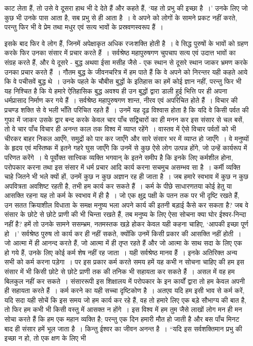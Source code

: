 काट लेता हैं, तो उसे वे दूसरा हाथ भी दे देते हैं और कहते हैं, ‘यह तो प्रभु की इच्छा है~।’ उनके लिए जो कुछ भी उनके पास आता है, सब प्रभु से ही आता है~। वे अपने को लोगों के सामने प्रकट नहीं करते, परन्तु फिर भी वे प्रेम तथा मधुर एवं सत्य भावों के प्रस्रवणस्वरूप हैं~।

इसके बाद फिर वे लोग हैं, जिनमें अपेक्षाकृत अधिक रजःशक्ति होती है~। वे सिद्ध पुरुषों के भावों को ग्रहण करके फिर उनका संसार में प्रचार करते हैं~। सर्वश्रेष्ठ महापुरुषगण चुपचाप सत्य एवं उदात्त भावों का संग्रह करते हैं, और ये दूसरे - बुद्ध अथवा ईसा मसीह जैसे - एक स्थान से दूसरे स्थान जाकर भ्रमण करके उनका प्रचार करते हैं~। गौतम बुद्ध के जीवनचरित्र में हम पाते हैं कि वे अपने को निरन्तर यही कहते आये कि वे पचीसवें बुद्ध थे~। उनके पहले के चौबीस बुद्धों के इतिहास का हमें कोई ज्ञान नहीं, परन्तु फिर भी यह निश्चित है कि ये हमारे ऐतिहासिक बुद्ध अवश्य ही उन बुद्धों द्वारा डाली हुई भित्ति पर ही अपना धर्मप्रासाद निर्माण कर गये हैं~। सर्वश्रेष्ठ महापुरुषगण शान्त, नीरव एवं अपरिचित होते हैं~। विचार की प्रचण्ड शक्ति से वे भली भाँति परिचित रहते हैं~। उनमें यह दृढ़ विश्वास होता है कि यदि वे किसी पर्वत की गुफा में जाकर उसके द्वार बन्द करके केवल चार पाँच सद्विचारों का ही मनन कर इस संसार से चल बसें, तो वे चार पाँच विचार ही अनन्त काल तक विश्व में व्याप्त रहेंगे~। वास्तव में ऐसे विचार पर्वतों को भी चीरकर बाहर निकल आएँगे, समुद्रों को पार कर जाएँगे और सारे संसार भर में व्याप्त हो जाएँगे~। वे मनुष्यों के हृदय एवं मस्तिष्क में इतने गहरे घुस जाएँगे कि उनमें से कुछ ऐसे लोग उत्पन्न होंगे, जो उन्हें कार्यरूप में परिणत करेंगे~। ये पूर्वोक्त सात्त्विक व्यक्ति भगवान् के इतने समीप है कि इनके लिए कर्मशील होना, परोपकार करना तथा इस संसार में धर्म प्रचार आदि कार्य करना सचमुच असम्भव सा है~। कर्मी व्यक्ति चाहे जितने भी भले क्यों हों, उनमें कुछ न कुछ अज्ञान रह ही जाता है~। जब हमारे स्वभाव में कुछ न कुछ अपवित्रता अवशिष्ट रहती है, तभी हम कार्य कर सकते हैं~। कर्म के पीछे साधारणतया कोई हेतु या आसक्ति रहना यह तो कर्म के स्वभाव में ही है~। जो एक क्षुद्र पक्षी के पतन तक पर भी दृष्टि रखते हैं, उन सतत क्रियाशील विधाता के समक्ष मनुष्य भला अपने कार्य की इतनी बड़ाई कैसे कर सकता है? जब वे संसार के छोटे से छोटे प्राणी की भी चिन्ता रखते हैं, तब मनुष्य के लिए ऐसा सोचना क्या घोर ईश्वर-निन्दा नहीं है? हमें तो उनके सामने ससम्भ्रम, नतमस्तक खड़े होकर केवल यही कहना चाहिए, ‘आपकी इच्छा पूर्ण हो~।’ सर्वश्रेष्ठ पुरुष तो कार्य कर ही नहीं सकते, क्योंकि उनमें किसी प्रकार की आसक्ति नहीं होती~। जो आत्मा में ही आनन्द करते हैं, जो आत्मा में ही तृप्त रहते हैं और जो आत्मा के साथ सदा के लिए एक हो गये हैं, उनके लिए कोई कर्म शेष नहीं रह जाता~। यही सर्वश्रेष्ठ मानव हैं~। इनके अतिरिक्त अन्य सभी को कर्म करना पड़ेगा~। पर इस प्रकार कर्म करते समय हमें यह कभी न सोचना चाहिए की हम इस संसार में भी किसी छोटे से छोटे प्राणी तक की तनिक भी सहायता कर सकते हैं~। असल में वह हम बिलकुल नहीं कर सकते~। संसाररूपी इस शिक्षालय में परोपकार के इन कार्यों द्वारा तो हम केवल अपनी ही सहायता करते हैं~। कर्म करने का यही सच्चा दृष्टिकोण है~। अतएव यदि हम इसी भाव से कर्म करें, यदि सदा यही सोचें कि इस समय जो हम कार्य कर रहे हैं, वह तो हमारे लिए एक बड़े सौभाग्य की बात है, तो फिर हम कभी भी किसी वस्तु में आसक्त न होंगे~। इस विश्व में हम तुम जैसे लाखों लोग मन ही मन सोचा करते हैं कि हम एक महान व्यक्ति है; परन्तु एक दिन हमारी मौत हो जाती है और बस पाँच मिनट बाद ही संसार हमें भूल जाता है~। किन्तु ईश्वर का जीवन अनन्त है~। “यदि इस सर्वशक्तिमान प्रभु की इच्छा न हो, तो एक क्षण के लिए भी 